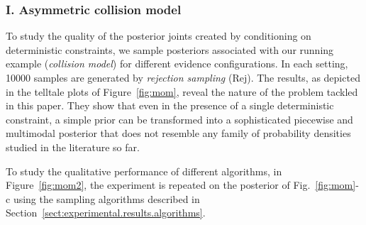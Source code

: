 \documentclass[]{article}
\begin{document}
\subsubsection*{I. Asymmetric collision model} 
To study the quality of the posterior joints created by conditioning on deterministic constraints,
we sample posteriors associated with our running example (\emph{collision model}) for different evidence configurations.
In each setting, 10000 samples are generated by \emph{rejection sampling} (Rej).
The results, as depicted in the telltale plots of Figure~\ref{fig:mom}, reveal the nature of the problem tackled in this paper.
They show that even in the presence of a single deterministic constraint, 
a simple prior can be transformed into a sophisticated piecewise and multimodal posterior that does not resemble any family of 
probability densities studied in the literature so far. 

To study the qualitative performance of different algorithms, 
in Figure~\ref{fig:mom2}, the experiment is repeated on the posterior of 
Fig.~\ref{fig:mom}-c using the sampling algorithms described in Section~\ref{sect:experimental.results.algorithms}. 

\end{document}
